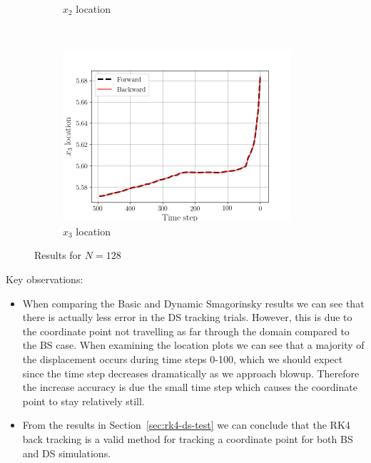 \begin{figure}[H]
\begin{subfigure}[H]{0.45\textwidth}
        \caption{$x_{2}$ location}
    \end{subfigure}
    ~
    \begin{subfigure}[H]{0.45\textwidth}
        \includegraphics[height=2.5in]{media/rk4/DS-N-128/x3-location.png}
        \caption{$x_{3}$ location}
    \end{subfigure}
    \caption{Results for $N=128$}
    \label{fig:ds-tracking-128-2}
\end{figure}
Key observations:
\begin{itemize}
    \item When comparing the Basic and Dynamic Smagorinsky results we can
        see that there is actually less error in the DS tracking trials.
        However, this is due to the coordinate point not travelling as far
        through the domain compared to the BS case. When examining the
        location plots we can see that a majority of the displacement
        occurs during time steps 0-100, which we should expect since the
        time step decreases dramatically as we approach blowup. Therefore
        the increase accuracy is due the small time step which causes the
        coordinate point to stay relatively still.

    \item From the results in Section~\ref{sec:rk4-ds-test} we can conclude
        that the RK4 back tracking is a valid method for tracking a
        coordinate point for both BS and DS simulations.

\end{itemize}
